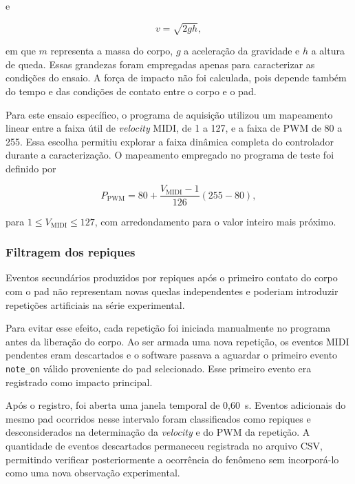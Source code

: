 e

\begin{equation}
v = \sqrt{2gh},
\end{equation}

em que $m$ representa a massa do corpo, $g$ a aceleração da gravidade e $h$ a altura de queda. Essas grandezas foram empregadas apenas para caracterizar as condições do ensaio. A força de impacto não foi calculada, pois depende também do tempo e das condições de contato entre o corpo e o pad.

Para este ensaio específico, o programa de aquisição utilizou um mapeamento linear entre a faixa útil de \textit{velocity} MIDI, de 1 a 127, e a faixa de PWM de 80 a 255. Essa escolha permitiu explorar a faixa dinâmica completa do controlador durante a caracterização. O mapeamento empregado no programa de teste foi definido por

\begin{equation}
P_{\mathrm{PWM}} =
80 +
\frac{V_{\mathrm{MIDI}}-1}{126}
\left(255-80\right),
\label{eq:mapeamento_ensaio_queda}
\end{equation}

para $1 \leq V_{\mathrm{MIDI}} \leq 127$, com arredondamento para o valor inteiro mais próximo.

\subsubsection{Filtragem dos repiques}
\label{sec:filtragem_repiques}

Eventos secundários produzidos por repiques após o primeiro contato do corpo com o pad não representam novas quedas independentes e poderiam introduzir repetições artificiais na série experimental.

Para evitar esse efeito, cada repetição foi iniciada manualmente no programa antes da liberação do corpo. Ao ser armada uma nova repetição, os eventos MIDI pendentes eram descartados e o software passava a aguardar o primeiro evento \texttt{note\_on} válido proveniente do pad selecionado. Esse primeiro evento era registrado como impacto principal.

Após o registro, foi aberta uma janela temporal de 0,60~s. Eventos adicionais do mesmo pad ocorridos nesse intervalo foram classificados como repiques e desconsiderados na determinação da \textit{velocity} e do PWM da repetição. A quantidade de eventos descartados permaneceu registrada no arquivo CSV, permitindo verificar posteriormente a ocorrência do fenômeno sem incorporá-lo como uma nova observação experimental.

